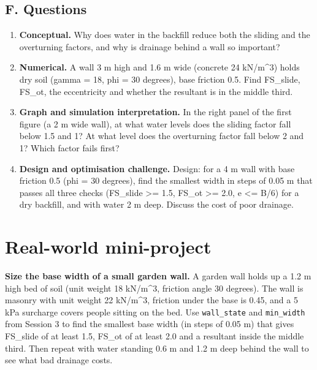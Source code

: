 \documentclass[11pt,a4paper]{article}
\begin{document}
\subsection*{F. Questions}
\begin{enumerate}[nosep]
\item \textbf{Conceptual.} Why does water in the backfill reduce both the sliding and the overturning factors, and why is drainage behind a wall so important?
\item \textbf{Numerical.} A wall 3 m high and 1.6 m wide (concrete 24 kN/m\textasciicircum{}3) holds dry soil (gamma = 18, phi = 30 degrees), base friction 0.5. Find FS\_slide, FS\_ot, the eccentricity and whether the resultant is in the middle third.
\item \textbf{Graph and simulation interpretation.} In the right panel of the first figure (a 2 m wide wall), at what water levels does the sliding factor fall below 1.5 and 1? At what level does the overturning factor fall below 2 and 1? Which factor fails first?
\item \textbf{Design and optimisation challenge.} Design: for a 4 m wall with base friction 0.5 (phi = 30 degrees), find the smallest width in steps of 0.05 m that passes all three checks (FS\_slide \textgreater{}= 1.5, FS\_ot \textgreater{}= 2.0, e \textless{}= B/6) for a dry backfill, and with water 2 m deep. Discuss the cost of poor drainage.
\end{enumerate}

\section{Real-world mini-project}
\textbf{Size the base width of a small garden wall.} A garden wall holds up a 1.2 m high bed of soil (unit weight 18 kN/m\textasciicircum{}3, friction angle 30 degrees). The wall is masonry with unit weight 22 kN/m\textasciicircum{}3, friction under the base is 0.45, and a 5 kPa surcharge covers people sitting on the bed. Use \texttt{wall\_state} and \texttt{min\_width} from Session 3 to find the smallest base width (in steps of 0.05 m) that gives FS\_slide of at least 1.5, FS\_ot of at least 2.0 and a resultant inside the middle third. Then repeat with water standing 0.6 m and 1.2 m deep behind the wall to see what bad drainage costs.
\end{document}
